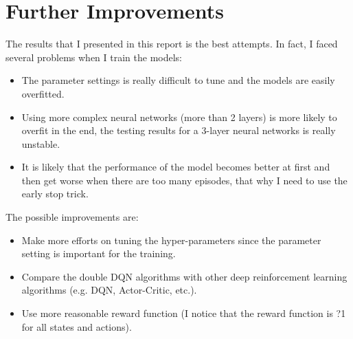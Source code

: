 \documentclass[11pt]{article}
\begin{document}
\section{Further Improvements}

The results that I presented in this report is the best attempts. In fact, I faced several problems when I train the models:
\begin{itemize}
\item The parameter settings is really difficult to tune and the models are easily overfitted. 
\item Using more complex neural networks (more than 2 layers) is more likely to overfit in the end, the testing results for a 3-layer neural networks is really unstable.
\item It is likely that the performance of the model becomes better at first and then get worse when there are too many episodes, that why I need to use the early stop trick.
\end{itemize}
The possible improvements are:
\begin{itemize}
\item Make more efforts on tuning the hyper-parameters since the parameter setting is important for the training.
\item Compare the double DQN algorithms with other deep reinforcement learning algorithms (e.g. DQN, Actor-Critic, etc.).
\item Use more reasonable reward function (I notice that the reward function is ?1 for all states and actions).
\end{itemize}







\end{document}
